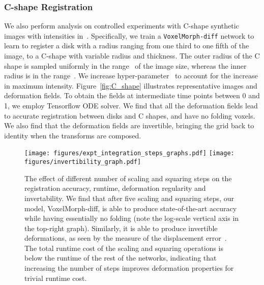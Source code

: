 \documentclass{article}
\begin{document}
{\color{blue} 
	\subsubsection{C-shape Registration}
	We also perform analysis on controlled experiments with C-shape synthetic images with intensities in~. Specifically, we train a \verb|VoxelMorph-diff| network to learn to register a disk with a radius ranging from one third to one fifth of the image, to a C-shape with variable radius and thickness. The outer radius of the C shape is sampled uniformly in the range~ of the image size, whereas the inner radius is in the range~. We increase hyper-parameter~ to account for the increase in maximum intensity. Figure~\ref{fig:C_shape} illustrates representative images and deformation fields. To obtain the fields at intermediate time points between 0 and 1, we employ Tensorflow ODE solver. We find that all the deformation fields lead to accurate registration between disks and C shapes, and have no folding voxels. We also find that the deformation fields are invertible, bringing the grid back to identity when the transforms are composed. }











\begin{figure}[t!]
	\begin{center}
		\texttt{[image: figures/expt\_integration\_steps\_graphs.pdf]}
		\texttt{[image: figures/invertibility\_graph.pdf]}
	\end{center}
	\caption{The effect of different number of scaling and squaring steps on the registration accuracy, runtime, deformation regularity and invertability. We find that after five scaling and squaring steps, our model, VoxelMorph-diff, is able to produce state-of-the-art accuracy while having essentially no folding (note the log-scale vertical axis in the top-right graph). Similarly, it is able to produce invertible deformations, as seen by the measure of the displacement error~. The total runtime cost of the scaling and squaring operations is below the runtime of the rest of the networks, indicating that increasing the number of steps improves deformation properties for trivial runtime cost.}
	\label{fig:expt_integration_steps}
\end{figure}
\end{document}
